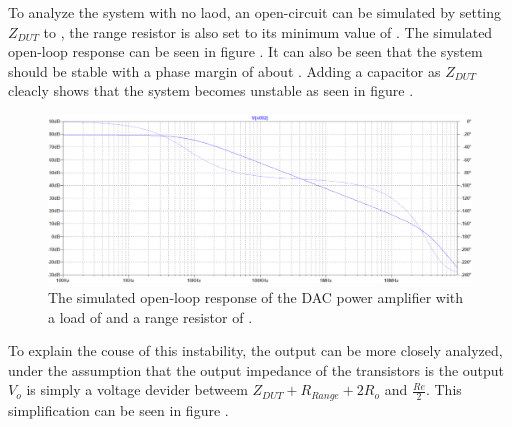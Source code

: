 To analyze the system with no laod, an open-circuit can be simulated by setting $Z_{DUT}$ to , the range resistor is also set to its minimum value of . The simulated open-loop response can be seen in figure . It can also be seen that the system should be stable with a phase margin of about . Adding a  capacitor as $Z_{DUT}$ cleacly shows that the system becomes unstable as seen in figure .

\begin{figure}[H]
    \centering
    \includegraphics[clip, trim=0 0 0 0, width=1\textwidth]{Sections/7_SystemDesign/Figures/7_1_1_5_DAC_PWR_AMP_150PF.pdf}
    \caption{The simulated open-loop response of the DAC power amplifier with a load  of  and a range resistor of .}
    \label{fig_7_1_1_5_DAC_POWER_AMP_SIM_150PF}
\end{figure}

To explain the couse of this instability, the output can be more closely analyzed, under the assumption that the output impedance of the transistors is  the output $V_o$ is simply a voltage devider betweem $Z_{DUT} + R_{Range} + 2R_o$ and $\frac{Re}{2}$. This simplification can be seen in figure .

